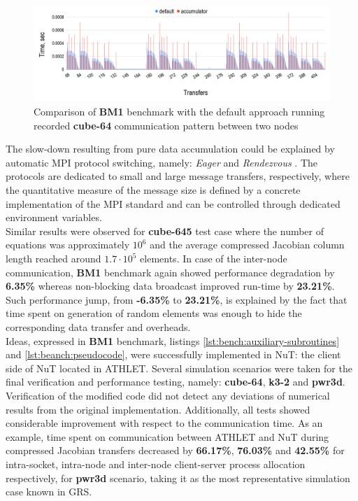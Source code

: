 \begin{figure}[htpb]
  \centering
  \includegraphics[width=1.0\textwidth]{figures/chapter-3/benchmark-result-non-blocking-inter-node-comm.png}
  \caption{Comparison of \textbf{BM1} benchmark with the default approach running recorded \textbf{cube-64} communication pattern between two nodes}
\label{fig:benchmark:results-cube-64-inter-node-comm}
\end{figure}


The slow-down resulting from pure data accumulation could be explained by automatic MPI protocol switching, namely: \textit{Eager} and \textit{Rendezvous} \cite{mpi:protocols-explanation}. The protocols are dedicated to small and large message transfers, respectively, where the quantitative measure of the message size is defined by a concrete implementation of the MPI standard and can be controlled through dedicated environment variables.\\



Similar results were observed for \textbf{cube-645} test case where the number of equations was approximately $10^6$ and the average compressed Jacobian column length reached around $1.7 \cdot 10^5$ elements. In case of the inter-node communication, \textbf{BM1} benchmark again showed performance degradation by \textbf{6.35\%} whereas non-blocking data broadcast improved run-time by \textbf{23.21\%}. Such performance jump, from \textbf{-6.35\%} to \textbf{23.21\%}, is explained by the fact that time spent on generation of random elements was enough to hide the corresponding data transfer and overheads.\\



Ideas, expressed in \textbf{BM1} benchmark, listings \ref{lst:bench:auxiliary-subroutines} and \ref{lst:beanch:pseudocode}, were successfully implemented in NuT: the client side of NuT located in ATHLET. Several simulation scenarios were taken for the final verification and performance testing, namely: \textbf{cube-64}, \textbf{k3-2} and \textbf{pwr3d}. Verification of the modified code did not detect any deviations of numerical results from the original implementation. Additionally, all tests showed considerable improvement with respect to the communication time. As an example, time spent on communication between ATHLET and NuT during compressed Jacobian transfers decreased by \textbf{66.17\%}, \textbf{76.03\%} and \textbf{42.55\%} for intra-socket, intra-node and inter-node client-server process allocation respectively, for \textbf{pwr3d} scenario, taking it as the most representative simulation case known in GRS.\\



